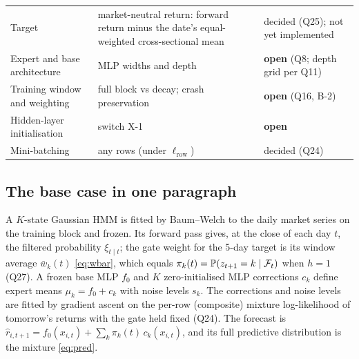 \begin{center}
\begin{tabularx}{\textwidth}{@{}p{4.2cm}Xp{3.3cm}@{}}
Target & market-neutral return: forward return minus the date's equal-weighted cross-sectional mean & decided (Q25); not yet implemented \\
Expert and base architecture & MLP widths and depth & \textbf{open} (Q8; depth grid per Q11) \\
Training window and weighting & full block vs decay; crash preservation & \textbf{open} (Q16, B-2) \\
Hidden-layer initialisation & switch X-1 & \textbf{open} \\
Mini-batching & any rows (under $\ell_{\text{row}}$) & decided (Q24) \\
\bottomrule
\end{tabularx}
\end{center}

\subsection{The base case in one paragraph}
A $K$-state Gaussian HMM is fitted by Baum--Welch to the daily market series on the training block and frozen. Its forward pass gives, at the close of each day $t$, the filtered probability $\xi_{t\mid t}$; the gate weight for the 5-day target is its window average $\bar w_k(t)$ \eqref{eq:wbar}, which equals $\pi_k(t)=\mathbb P(z_{t+1}=k\mid\mathcal{F}_t)$ when $h=1$ (Q27). A frozen base MLP $f_0$ and $K$ zero-initialised MLP corrections $c_k$ define expert means $\mu_k=f_0+c_k$ with noise levels $s_k$. The corrections and noise levels are fitted by gradient ascent on the per-row (composite) mixture log-likelihood of tomorrow's returns with the gate held fixed (Q24). The forecast is $\hat r_{i,t+1}=f_0(x_{i,t})+\sum_k\pi_k(t)\,c_k(x_{i,t})$, and its full predictive distribution is the mixture \eqref{eq:pred}.
\newpage
